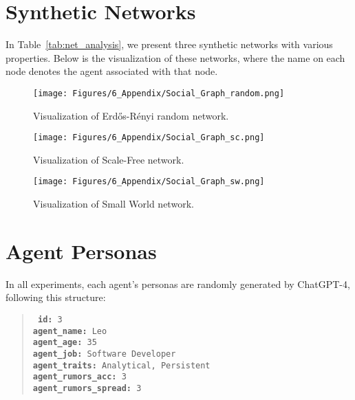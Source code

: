\section{Synthetic Networks}
In Table~\ref{tab:net_analysis}, we present three synthetic networks with various properties. Below is the visualization of these networks, where the name on each node denotes the agent associated with that node.

\begin{figure}[h]
    \centering
    \texttt{[image: Figures/6\_Appendix/Social\_Graph\_random.png]}
    \caption{Visualization of Erdős-Rényi random network.}
    \label{fig:app_1_1}
\end{figure}

\begin{figure}[h]
    \centering
    \texttt{[image: Figures/6\_Appendix/Social\_Graph\_sc.png]}
    \caption{Visualization of Scale-Free network.}
    \label{fig:app_1_2}
\end{figure}

\begin{figure}[h]
    \centering
    \texttt{[image: Figures/6\_Appendix/Social\_Graph\_sw.png]}
    \caption{Visualization of Small World network.}
    \label{fig:app_1_3}
\end{figure}

\section{Agent Personas}

In all experiments, each agent's personas are randomly generated by ChatGPT-4, following this structure:

\begin{mdframed}
\begin{quote}
    \tt \small
    \textbf{id:} 3\\
    \textbf{agent\_name:} Leo\\
    \textbf{agent\_age:} 35\\
    \textbf{agent\_job:} Software Developer\\
    \textbf{agent\_traits:} Analytical, Persistent\\
    \textbf{agent\_rumors\_acc:} 3\\
    \textbf{agent\_rumors\_spread:} 3
\end{quote}
\end{mdframed}

